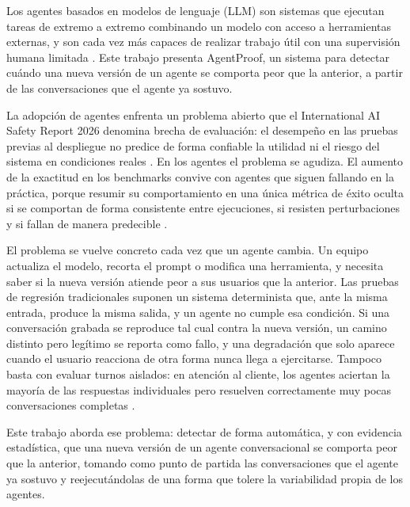 \clearpage
\blank
{}
\begingroup\dobleesp
\vspace{6pt}
Los agentes basados en modelos de lenguaje (LLM) son sistemas que ejecutan tareas de extremo a extremo combinando un modelo con acceso a herramientas externas, y son cada vez más capaces de realizar trabajo útil con una supervisión humana limitada \cite{iasr2026}. Este trabajo presenta AgentProof, un sistema para detectar cuándo una nueva versión de un agente se comporta peor que la anterior, a partir de las conversaciones que el agente ya sostuvo.
\par

La adopción de agentes enfrenta un problema abierto que el International AI Safety Report 2026 denomina brecha de evaluación: el desempeño en las pruebas previas al despliegue no predice de forma confiable la utilidad ni el riesgo del sistema en condiciones reales \cite{iasr2026}. En los agentes el problema se agudiza. El aumento de la exactitud en los benchmarks convive con agentes que siguen fallando en la práctica, porque resumir su comportamiento en una única métrica de éxito oculta si se comportan de forma consistente entre ejecuciones, si resisten perturbaciones y si fallan de manera predecible \cite{rabanser2026reliability}.
\par\vspace{6pt}
El problema se vuelve concreto cada vez que un agente cambia. Un equipo actualiza el modelo, recorta el prompt o modifica una herramienta, y necesita saber si la nueva versión atiende peor a sus usuarios que la anterior. Las pruebas de regresión tradicionales suponen un sistema determinista que, ante la misma entrada, produce la misma salida, y un agente no cumple esa condición. Si una conversación grabada se reproduce tal cual contra la nueva versión, un camino distinto pero legítimo se reporta como fallo, y una degradación que solo aparece cuando el usuario reacciona de otra forma nunca llega a ejercitarse. Tampoco basta con evaluar turnos aislados: en atención al cliente, los agentes aciertan la mayoría de las respuestas individuales pero resuelven correctamente muy pocas conversaciones completas \cite{arcadinho2024almita}.
\par\vspace{6pt}
Este trabajo aborda ese problema: detectar de forma automática, y con evidencia estadística, que una nueva versión de un agente conversacional se comporta peor que la anterior, tomando como punto de partida las conversaciones que el agente ya sostuvo y reejecutándolas de una forma que tolere la variabilidad propia de los agentes.
\par

